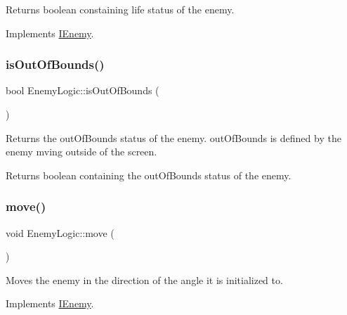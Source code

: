 \begin{DoxyReturn}{Returns}
boolean constaining life status of the enemy. 
\end{DoxyReturn}


Implements \hyperlink{class_i_enemy_a3e44ca5e5fabcfd71b26657eba26e5a2}{I\+Enemy}.

\mbox{\label{class_enemy_logic_a2e3e9e006259b36745beff4b55fd9bdc}} 
\subsubsection{\texorpdfstring{is\+Out\+Of\+Bounds()}{isOutOfBounds()}}
{\footnotesize\ttfamily bool Enemy\+Logic\+::is\+Out\+Of\+Bounds (\begin{DoxyParamCaption}{ }\end{DoxyParamCaption})}



Returns the out\+Of\+Bounds status of the enemy. out\+Of\+Bounds is defined by the enemy mving outside of the screen. 

\begin{DoxyReturn}{Returns}
boolean containing the out\+Of\+Bounds status of the enemy. 
\end{DoxyReturn}
\mbox{\label{class_enemy_logic_a2bc8ba642d677ab31f4b54ec00299e25}} 
\subsubsection{\texorpdfstring{move()}{move()}}
{\footnotesize\ttfamily void Enemy\+Logic\+::move (\begin{DoxyParamCaption}{ }\end{DoxyParamCaption})\hspace{0.3cm}{\ttfamily [virtual]}}



Moves the enemy in the direction of the angle it is initialized to. 



Implements \hyperlink{class_i_enemy_a0dbed8e8e15436305b6ede08b618c232}{I\+Enemy}.

\mbox{\label{class_enemy_logic_a560cc578db8a77f250b63a111f51125e}} 
